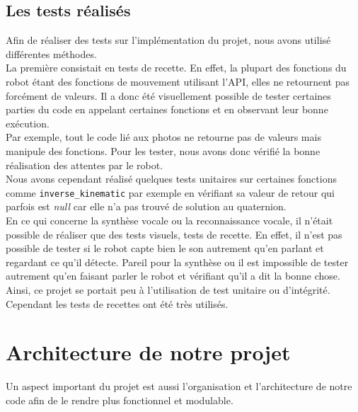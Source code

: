 \documentclass[a4paper,french]{article}
\begin{document}
\subsection{Les tests réalisés}
Afin de réaliser des tests sur l'implémentation du projet, nous avons utilisé différentes méthodes. \\

La première consistait en tests de recette. En effet, la plupart des fonctions du robot étant des fonctions de mouvement utilisant l'API, elles ne retournent pas forcément de valeurs. Il a donc été visuellement possible de tester certaines parties du code en appelant certaines fonctions et en observant leur bonne exécution. \\

Par exemple, tout le code lié aux photos ne retourne pas de valeurs mais manipule des fonctions. Pour les tester, nous avons donc vérifié la bonne réalisation des attentes par le robot. \\

Nous avons cependant réalisé quelques tests unitaires sur certaines fonctions comme \texttt{inverse\_kinematic} par exemple en vérifiant sa valeur de retour qui parfois est \textit{null} car elle n'a pas trouvé de solution au quaternion. \\

En ce qui concerne la synthèse vocale ou la reconnaissance vocale, il n'était possible de réaliser que des tests visuels, tests de recette. En effet, il n'est pas possible de tester si le robot capte bien le son autrement qu'en parlant et regardant ce qu'il détecte. Pareil pour la synthèse ou il est impossible de tester autrement qu'en faisant parler le robot et vérifiant qu'il a dit la bonne chose. \\

Ainsi, ce projet se portait peu à l'utilisation de test unitaire ou d'intégrité. Cependant les tests de recettes ont été très utilisés.

\section{Architecture de notre projet}
Un aspect important du projet est aussi l'organisation et l'architecture de notre code afin de le rendre plus fonctionnel et modulable.
\end{document}
